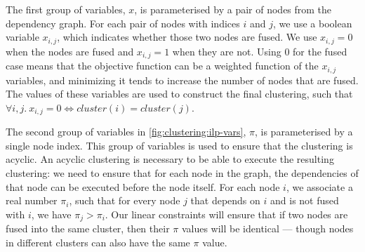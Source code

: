 
The first group of variables, $x$, is parameterised by a pair of nodes from the dependency graph.
For each pair of nodes with indices $i$ and $j$, we use a boolean variable $x_{i,j}$, which indicates whether those two nodes are fused.
We use $x_{i,j} = 0$ when the nodes are fused and $x_{i,j} = 1$ when they are not.
Using $0$ for the fused case means that the objective function can be a weighted function of the $x_{i,j}$ variables, and minimizing it tends to increase the number of nodes that are fused.
The values of these variables are used to construct the final clustering, such that $\forall i,j.\ x_{i,j} = 0 \iff \mathit{cluster}(i) = \mathit{cluster}(j)$.

The second group of variables in \cref{fig:clustering:ilp-vars}, $\pi$, is parameterised by a single node index.
This group of variables is used to ensure that the clustering is acyclic.
An acyclic clustering is necessary to be able to execute the resulting clustering: we need to ensure that for each node in the graph, the dependencies of that node can be executed before the node itself.
For each node $i$, we associate a real number $\pi_i$, such that for every node $j$ that depends on $i$ and is not fused with $i$, we have $\pi_j > \pi_i$.
Our linear constraints will ensure that if two nodes are fused into the same cluster, then their $\pi$ values will be identical --- though nodes in different clusters can also have the same $\pi$ value.


